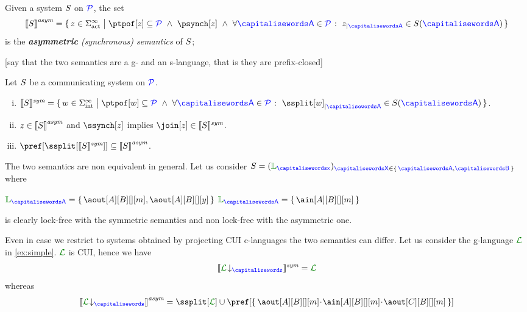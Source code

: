 \begin{definition}\label{def:syncSem}
  Given a system $S$ on $\mathcal{\color{blue}{P}}$, the set
  \[
	 \asem{\aCS} = \Set{z \in \alfact^\infty \sst \ptpof[z] \subseteq \ptpset \ \land\ \psynch[z]\  \land\ \forall \p \in
		\ptpset \qst \filter{z}{\p} \in \aCS(\p)  }
  \]
  is the \emph{{\bf asymmetric} (synchronous) semantics} of $S$;
  
%  
%  
\end{definition}

[say that the two semantics are a g- and an s-language, that is they are prefix-closed]

\begin{lemma}
\label{fac:asymmsubsymm}
Let  $S$ be a communicating system on $\mathcal{\color{blue}{P}}$.
\begin{enumerate}[i)]
\item
$\ssem{\aCS} =  
\Set{\acword \in \alfint^\infty \sst  
\ptpof[\acword] \subseteq \ptpset \ \land\ \forall \p \in \ptpset \qst \filter{\ssplit[\acword]}{\p} \in \aCS(\p)}$.
\item
\label{fac:asymmsubsymm-aimps}
$z\in{\llbracket S\rrbracket}^{\textit{asym}}$ and $\ssynch[z]$ implies $\join[z]\in\ssem{\aCS}$.
\item
\label{fac:asymmsubsymm-asubs}
$\pref[{\ssplit[{\ssem{\aCS}}]}] \subseteq \asem{\aCS}$.
\end{enumerate}
\end{lemma}

\begin{example}
\label{ex:simple2}
The two semantics are non equivalent in general.
Let us consider $\aCS = ({\alang}_{\px})_{\ptp[X] \in \Set{\p,\q}}$ where\\
\centerline{$\alang_{\p}= \Set{\aout[A][B][][m], \aout[A][B][][y]}$ \qquad $\alang_{\p}= \Set{\ain[A][B][][m]}$ }
is clearly lock-free with the symmetric semantics and non lock-free with the asymmetric one.

 Even in case we restrict to systems
obtained by projecting CUI c-languages the two semantics can differ.
Let us consider the g-language $\clang$ in \cref{ex:simple}.
$\clang$ is CUI, hence we have 
  $$\ssem{\proj{\clang}{}} = \clang$$ 
whereas 
  $$\asem{\proj{\clang}{}} = \ssplit[\clang] \cup \pref[\Set{\aout[A][B][][m]\cat\ain[A][B][][m]\cat\aout[C][B][][m]}]$$
\finex
\end{example} 

